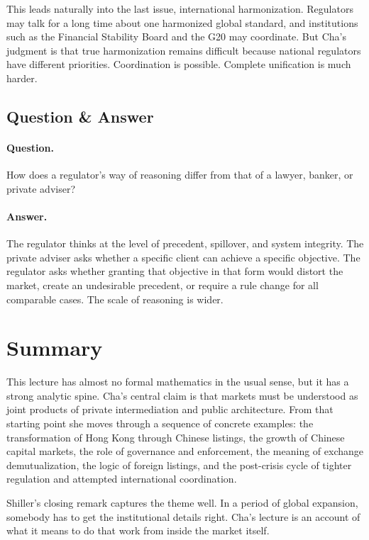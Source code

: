 This leads naturally into the last issue, international harmonization. Regulators may talk for a long time about one harmonized global standard, and institutions such as the Financial Stability Board and the G20 may coordinate. But Cha's judgment is that true harmonization remains difficult because national regulators have different priorities. Coordination is possible. Complete unification is much harder.

\subsection{Question \& Answer}

\paragraph{Question.} How does a regulator's way of reasoning differ from that of a lawyer, banker, or private adviser?

\paragraph{Answer.} The regulator thinks at the level of precedent, spillover, and system integrity. The private adviser asks whether a specific client can achieve a specific objective. The regulator asks whether granting that objective in that form would distort the market, create an undesirable precedent, or require a rule change for all comparable cases. The scale of reasoning is wider.

\section{Summary}

This lecture has almost no formal mathematics in the usual sense, but it has a strong analytic spine. Cha's central claim is that markets must be understood as joint products of private intermediation and public architecture. From that starting point she moves through a sequence of concrete examples: the transformation of Hong Kong through Chinese listings, the growth of Chinese capital markets, the role of governance and enforcement, the meaning of exchange demutualization, the logic of foreign listings, and the post-crisis cycle of tighter regulation and attempted international coordination.

Shiller's closing remark captures the theme well. In a period of global expansion, somebody has to get the institutional details right. Cha's lecture is an account of what it means to do that work from inside the market itself.